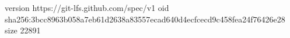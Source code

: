 version https://git-lfs.github.com/spec/v1
oid sha256:3bcc8963b058a7eb61d2638a83557ecad640d4ecfcecd9c458fea24f76426e28
size 22891
